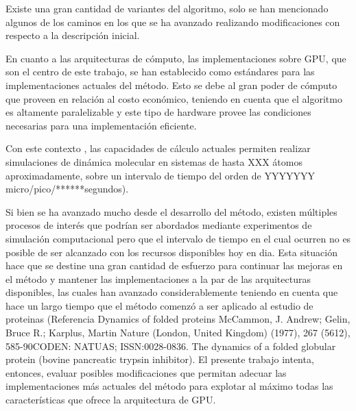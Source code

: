 Existe una gran cantidad de variantes del algoritmo, solo se han mencionado algunos de los caminos en los que se ha avanzado realizando modificaciones con respecto a la descripción inicial.

En cuanto a las arquitecturas de cómputo, las implementaciones sobre GPU, que son el centro de este trabajo, se han establecido como estándares para las implementaciones actuales del método.
Esto se debe al gran poder de cómputo que proveen en relación al costo económico, teniendo en cuenta que el algoritmo es altamente paralelizable y este tipo de hardware provee las condiciones necesarias para una implementación eficiente.

Con este contexto , las capacidades de cálculo actuales permiten realizar simulaciones de dinámica molecular en sistemas de hasta XXX átomos aproximadamente, sobre un intervalo de tiempo del orden de YYYYYYY  micro/pico/******segundos).

Si bien se ha avanzado mucho desde el desarrollo del método, existen múltiples procesos de interés que podrían ser abordados mediante experimentos de simulación computacional pero que el intervalo de tiempo en el cual ocurren no es posible de ser alcanzado con los recursos disponibles hoy en dia.
Esta situación hace que se destine una gran cantidad de esfuerzo para continuar las mejoras en el método y mantener las implementaciones a la par de las arquitecturas disponibles, las cuales han avanzado considerablemente teniendo en cuenta que hace un largo tiempo que el método comenzó a ser aplicado al estudio de proteinas (Referencia Dynamics of folded proteins
McCammon, J. Andrew; Gelin, Bruce R.; Karplus, Martin
Nature (London, United Kingdom) (1977), 267 (5612), 585-90CODEN: NATUAS; ISSN:0028-0836.
The dynamics of a folded globular protein (bovine pancreatic trypsin inhibitor).
El presente trabajo intenta, entonces, evaluar posibles modificaciones que permitan adecuar las implementaciones más actuales del método para explotar al máximo todas las características que ofrece la arquitectura de GPU. 







